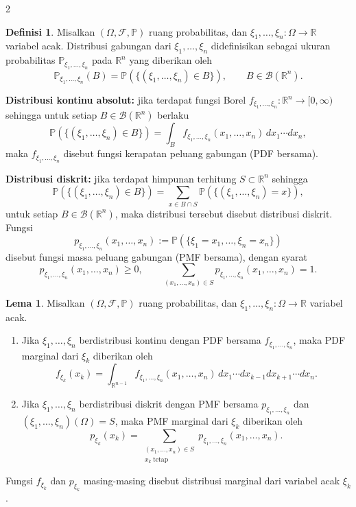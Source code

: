 \documentclass[a4paper,extrafontsizes, 9pt]{memoir}
\theoremstyle{definition}
\newtheorem{definisi}[kalstok]{Definisi}
\newtheorem{lemma}[kalstok]{Lema}
\theoremstyle{plain}
\theoremstyle{remark}
\begin{document}
\begin{multicols}{2}
  \begin{definisi}
    Misalkan $(\Omega,\mathcal{F},\mathbb{P})$ ruang probabilitas, dan
    $\xi_1,\ldots,\xi_n:\Omega\to\mathbb{R}$ variabel acak.
    Distribusi gabungan dari $\xi_1,\ldots,\xi_n$ didefinisikan sebagai ukuran probabilitas
    $\mathbb{P}_{\xi_1,\ldots,\xi_n}$ pada $\mathbb{R}^n$ yang diberikan oleh
    \[\mathbb{P}_{\xi_1,\ldots,\xi_n}(B)=\mathbb{P}(\{(\xi_1,\ldots,\xi_n)\in B\}),\qquad B\in\mathcal{B}(\mathbb{R}^n).\]

    \textbf{Distribusi kontinu absolut:} jika terdapat fungsi Borel
    $f_{\xi_1,\ldots,\xi_n}:\mathbb{R}^n\to[0,\infty)$ sehingga untuk setiap $B\in\mathcal{B}(\mathbb{R}^n)$
    berlaku
    \[\mathbb{P}(\{(\xi_1,\ldots,\xi_n)\in B\})=\int_B f_{\xi_1,\ldots,\xi_n}(x_1,\ldots,x_n)\,dx_1\cdots dx_n,\]
    maka $f_{\xi_1,\ldots,\xi_n}$ disebut fungsi kerapatan peluang gabungan (PDF bersama).

    \textbf{Distribusi diskrit:} jika terdapat himpunan terhitung $S\subset\mathbb{R}^n$ sehingga
    \[\mathbb{P}(\{(\xi_1,\ldots,\xi_n)\in B\})=\sum_{x\in B\cap S}\mathbb{P}(\{(\xi_1,\ldots,\xi_n)=x\}),\]
    untuk setiap $B\in\mathcal{B}(\mathbb{R}^n)$, maka distribusi tersebut disebut distribusi diskrit.
    Fungsi
    \[p_{\xi_1,\ldots,\xi_n}(x_1,\ldots,x_n):=\mathbb{P}(\{\xi_1=x_1,\ldots,\xi_n=x_n\})\]
    disebut fungsi massa peluang gabungan (PMF bersama), dengan syarat
    \[p_{\xi_1,\ldots,\xi_n}(x_1,\ldots,x_n)\ge0,\qquad
      \sum_{(x_1,\ldots,x_n)\in S}p_{\xi_1,\ldots,\xi_n}(x_1,\ldots,x_n)=1.\]
  \end{definisi}

  \begin{lemma}
    Misalkan $(\Omega,\mathcal{F},\mathbb{P})$ ruang probabilitas, dan
    $\xi_1,\ldots,\xi_n:\Omega\to\mathbb{R}$ variabel acak.
    \begin{enumerate}[leftmargin=*, itemsep=0.5mm]
      \item Jika $\xi_1,\ldots,\xi_n$ berdistribusi kontinu dengan PDF bersama
            $f_{\xi_1,\ldots,\xi_n}$, maka PDF marginal dari $\xi_k$ diberikan oleh
            \[f_{\xi_k}(x_k)=\int_{\mathbb{R}^{n-1}} f_{\xi_1,\ldots,\xi_n}(x_1,\ldots,x_n)
              \,dx_1\cdots dx_{k-1}dx_{k+1}\cdots dx_n.\]
      \item Jika $\xi_1,\ldots,\xi_n$ berdistribusi diskrit dengan PMF bersama
            $p_{\xi_1,\ldots,\xi_n}$ dan $(\xi_1,\ldots,\xi_n)(\Omega)=S$, maka PMF marginal dari $\xi_k$ diberikan oleh
            \[p_{\xi_k}(x_k)=\sum_{\substack{(x_1,\ldots,x_n)\in S\\x_k\ \text{tetap}}}
              p_{\xi_1,\ldots,\xi_n}(x_1,\ldots,x_n).\]
    \end{enumerate}
    Fungsi $f_{\xi_k}$ dan $p_{\xi_k}$ masing-masing disebut distribusi marginal dari variabel acak $\xi_k$.
  \end{lemma}


\end{multicols}
\end{document}
